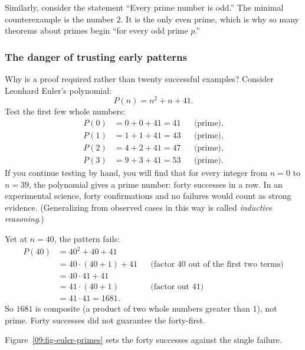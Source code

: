 Similarly, consider the statement ``Every prime number is odd.'' The minimal counterexample is the number $2$. It is the only even prime, which is why so many theorems about primes begin ``for every odd prime $p$.''

\subsubsection*{The danger of trusting early patterns}
Why is a proof required rather than twenty successful examples? Consider Leonhard Euler's polynomial:
\[
P(n) = n^2 + n + 41.
\]
Test the first few whole numbers:
\begin{align*}
P(0) &= 0 + 0 + 41 = 41 && \text{(prime)}, \\
P(1) &= 1 + 1 + 41 = 43 && \text{(prime)}, \\
P(2) &= 4 + 2 + 41 = 47 && \text{(prime)}, \\
P(3) &= 9 + 3 + 41 = 53 && \text{(prime)}.
\end{align*}
If you continue testing by hand, you will find that for every integer from $n = 0$ to $n = 39$, the polynomial gives a prime number: forty successes in a row. In an experimental science, forty confirmations and no failures would count as strong evidence. (Generalizing from observed cases in this way is called \emph{inductive reasoning}.)

Yet at $n = 40$, the pattern fails:
\begin{align*}
P(40) &= 40^2 + 40 + 41 \\
      &= 40 \cdot (40 + 1) + 41 && \text{(factor $40$ out of the first two terms)} \\
      &= 40 \cdot 41 + 41 \\
      &= 41 \cdot (40 + 1) && \text{(factor out $41$)} \\
      &= 41 \cdot 41 = 1681.
\end{align*}
So $1681$ is composite (a product of two whole numbers greater than $1$), not prime. Forty successes did not guarantee the forty-first.

Figure~\ref{09:fig-euler-primes} sets the forty successes against the single failure.

